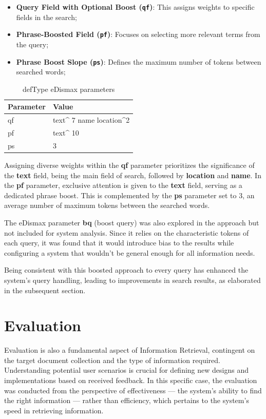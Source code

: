 \documentclass[sigconf]{acmart}
\begin{document}
\begin{itemize}
    \item \textbf{Query Field with Optional Boost (\texttt{qf})}: This assigns weights to specific fields in the search;
    \item \textbf{Phrase-Boosted Field (\texttt{pf})}: Focuses on selecting more relevant terms from the query;
    \item \textbf{Phrase Boost Slope (\texttt{ps})}: Defines the maximum number of tokens between searched words;
\end{itemize}

\begin{table}[H]
\small
\caption{defType eDismax parameters}
\label{tab:edismax_par}
\begin{tabular}{ll}
\toprule
Parameter & Value\\
\midrule
qf & text\textasciicircum{} 7 name location\textasciicircum{}2
  \\
pf & text\textasciicircum{} 10 \\
ps & 3 \\
\bottomrule
\end{tabular}
\end{table}

Assigning diverse weights within the \textbf{qf} parameter prioritizes the significance of the \textbf{text} field, being the main field of search, followed by \textbf{location} and \textbf{name}. In the \textbf{pf} parameter, exclusive attention is given to the \textbf{text} field, serving as a dedicated phrase boost. This is complemented by the \textbf{ps} parameter set to 3, an average number of maximum tokens between the searched words.

The eDismax parameter \textbf{bq} (boost query) was also explored in the approach but not included for system analysis. Since it relies on the characteristic tokens of each query, it was found that it would introduce bias to the results while configuring a system that wouldn't be general enough for all information needs.

Being consistent with this boosted approach to every query has enhanced the system's query handling, leading to improvements in search results, as elaborated in the subsequent section.

\section{ Evaluation }
\label{sec:evaluation}

Evaluation is also a fundamental aspect of Information Retrieval, contingent on the target document collection and the type of information required. Understanding potential user scenarios is crucial for defining new designs and implementations based on received feedback. In this specific case, the evaluation was conducted from the perspective of effectiveness — the system's ability to find the right information — rather than efficiency, which pertains to the system's speed in retrieving information.
\end{document}
